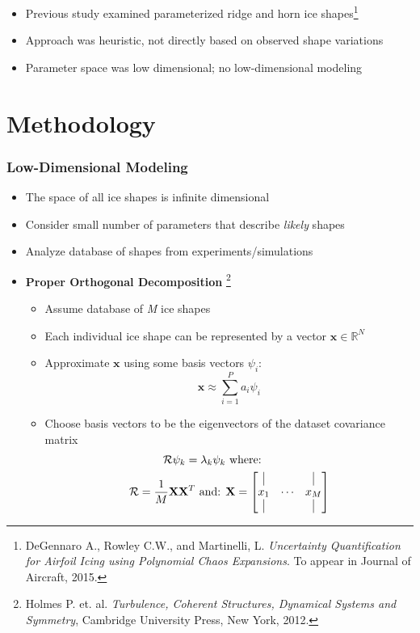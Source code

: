 \documentclass[9pt]{beamer}
\newcommand{\bv}[1]{\mathbf{#1}}
\begin{document}
\begin{frame}
\begin{itemize}
\item Previous study examined parameterized ridge and horn ice
  shapes\footnote{DeGennaro A., Rowley C.W., and Martinelli,
L. \emph{Uncertainty Quantification for Airfoil Icing using Polynomial Chaos Expansions}. To appear in Journal of Aircraft, 2015.
 }
\item Approach was heuristic, not directly based on observed shape
  variations
\item Parameter space was low dimensional; no low-dimensional modeling
\end{itemize}
\end{frame}
\section{Methodology}
\label{sec-2}
\begin{frame}
\frametitle{Low-Dimensional Modeling}
\label{sec-2-1}


\begin{itemize}
\item The space of all ice shapes is infinite dimensional
\item Consider small number of parameters that describe \emph{likely} shapes
\item Analyze database of shapes from experiments/simulations
\item \textbf{Proper Orthogonal Decomposition} \footnote{Holmes P. et. al. \emph{Turbulence, Coherent Structures, Dynamical Systems and Symmetry}, Cambridge University Press, New York, 2012.
 }
\begin{itemize}
\item Assume database of \emph{M} ice shapes
\item Each individual ice shape can be represented by a vector $\bv{x}
    \in \mathbb{R}^N$
\item Approximate $\bv{x}$ using some basis vectors $\psi_i$:
    \begin{equation*}
      \bv{x} \approx \sum_{i=1}^P a_i \psi_i
    \end{equation*}
\item Choose basis vectors to be the eigenvectors of the dataset
    covariance matrix
    \begin{equation*}
    \begin{aligned}
      \mathcal{R} \psi_k = \lambda_k \psi_k& \text{   where:   } \\ 
      \mathcal{R} = \frac{1}{M}\mathbf{X}\mathbf{X}^T \text{   and:   }&
      \mathbf{X} =
       \begin{bmatrix}
        \vline & & \vline \\
        x_1 & \cdots & x_M \\
        \vline & & \vline \\
       \end{bmatrix}
    \end{aligned}
    \end{equation*}
\end{itemize}
\end{itemize}
\end{frame}
\end{document}
